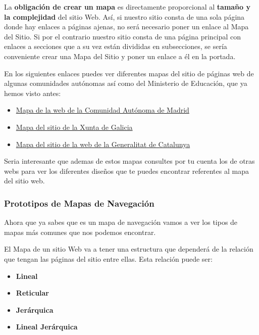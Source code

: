 La \textbf{obligación de crear un mapa} es directamente proporcional al \textbf{tamaño y la complejidad} del sitio Web. Así, si nuestro sitio consta de una sola página donde hay enlaces a páginas ajenas, no será necesario poner un enlace al Mapa del Sitio. Si por el contrario nuestro sitio consta de una página principal con enlaces a secciones que a su vez están divididas en subsecciones, se sería conveniente crear una Mapa del Sitio y poner un enlace a él en la portada.

En los siguientes enlaces puedes ver diferentes mapas del sitio de páginas web de algunas comunidades autónomas así como del Ministerio de Educación, que ya hemos visto antes:

\begin{itemize}
    \item \href{https://sede.comunidad.madrid/buscador?t=&tipo=All&consejeria=All&estado_pendiente%5B1%5D=1&estado_plazo%5B1%5D=1&estado_tramitacion%5B1%5D=1}{Mapa de la web de la Comunidad Autónoma de Madrid}
    \item \href{https://www.xunta.gal/mapa-do-portal}{Mapa del sitio de la Xunta de Galicia}
    \item \href{https://web.gencat.cat/es/ajuda/mapaweb/}{Mapa del sitio de la web de la Generalitat de Catalunya}
\end{itemize}

Seria interesante que ademas de estos mapas consultes por tu cuenta los de otras webs para ver los diferentes diseños que te puedes encontrar referentes al mapa del sitio web.

\subsubsection{Prototipos de Mapas de Navegación}
Ahora que ya sabes que es un mapa de navegación vamos a ver los tipos de mapas más comunes que nos podemos encontrar.

El Mapa de un sitio Web va a tener una estructura que dependerá de la relación que tengan las páginas del sitio entre ellas. Esta relación puede ser:

\begin{itemize}
    \item \textbf{Lineal}
    \item \textbf{Reticular}
    \item \textbf{Jerárquica}
    \item \textbf{Lineal Jerárquica}
\end{itemize}


